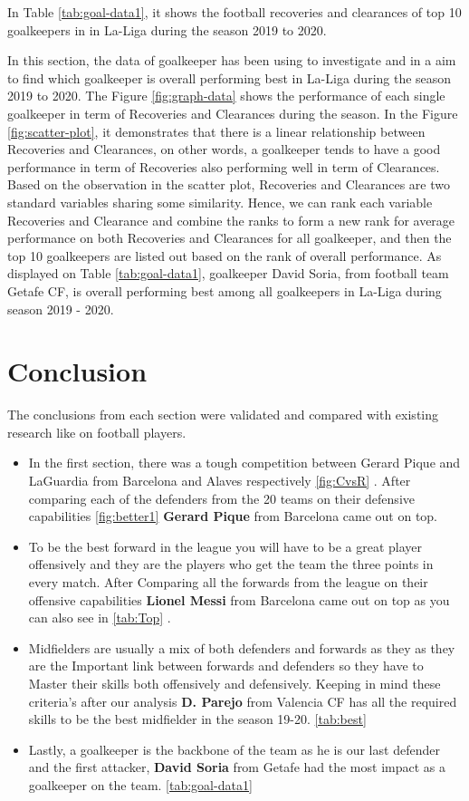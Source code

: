 \documentclass[11pt,a4paper,]{article}
\begin{document}
In Table \ref{tab:goal-data1}, it shows the football recoveries and clearances of top 10 goalkeepers in in La-Liga during the season 2019 to 2020.

In this section, the data of goalkeeper has been using to investigate and in a aim to find which goalkeeper is overall performing best in La-Liga during the season 2019 to 2020. The Figure \ref{fig:graph-data} shows the performance of each single goalkeeper in term of Recoveries and Clearances during the season. In the Figure \ref{fig:scatter-plot}, it demonstrates that there is a linear relationship between Recoveries and Clearances, on other words, a goalkeeper tends to have a good performance in term of Recoveries also performing well in term of Clearances. Based on the observation in the scatter plot, Recoveries and Clearances are two standard variables sharing some similarity. Hence, we can rank each variable Recoveries and Clearance and combine the ranks to form a new rank for average performance on both Recoveries and Clearances for all goalkeeper, and then the top 10 goalkeepers are listed out based on the rank of overall performance. As displayed on Table \ref{tab:goal-data1}, goalkeeper David Soria, from football team Getafe CF, is overall performing best among all goalkeepers in La-Liga during season 2019 - 2020.

\hypertarget{conclusion}{%
\section{Conclusion}\label{conclusion}}

The conclusions from each section were validated and compared with existing research like \textcite{brito2019new} on football players.

\begin{itemize}
\item
  In the first section, there was a tough competition between Gerard Pique and LaGuardia from Barcelona and Alaves respectively \ref{fig:CvsR} . After comparing each of the defenders from the 20 teams on their defensive capabilities \ref{fig:better1} \textbf{Gerard Pique} from Barcelona came out on top.
\item
  To be the best forward in the league you will have to be a great player offensively and they are the players who get the team the three points in every match. After Comparing all the forwards from the league on their offensive capabilities \textbf{Lionel Messi} from Barcelona came out on top as you can also see in \ref{tab:Top} .
\item
  Midfielders are usually a mix of both defenders and forwards as they as they are the Important link between forwards and defenders so they have to Master their skills both offensively and defensively. Keeping in mind these criteria's after our analysis \textbf{D. Parejo} from Valencia CF has all the required skills to be the best midfielder in the season 19-20. \ref{tab:best}
\item
  Lastly, a goalkeeper is the backbone of the team as he is our last defender and the first attacker, \textbf{David Soria} from Getafe had the most impact as a goalkeeper on the team. \ref{tab:goal-data1}
\end{itemize}

\printbibliography
\end{document}
